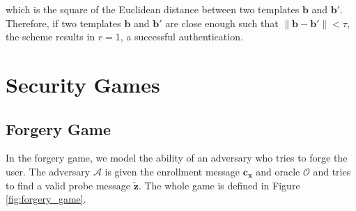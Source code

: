 which is the square of the Euclidean distance between two templates $\mathbf{b}$ and $\mathbf{b}'$. Therefore, if two templates $\mathbf{b}$ and $\mathbf{b}'$ are close enough such that $\|\mathbf{b} - \mathbf{b'}\| < \tau$, the scheme results in $r = 1$, a successful authentication.



\section*{Security Games}


\subsection*{Forgery Game}
\label{sec:forgery_game}

In the forgery game, we model the ability of an adversary who tries to forge the user. The adversary $\mathcal{A}$ is given the enrollment message $\mathbf{c_x}$ and oracle $\mathcal{O}$ and tries to find a valid probe message $\mathbf{\tilde{z}}$. The whole game is defined in Figure \ref{fig:forgery_game}.

